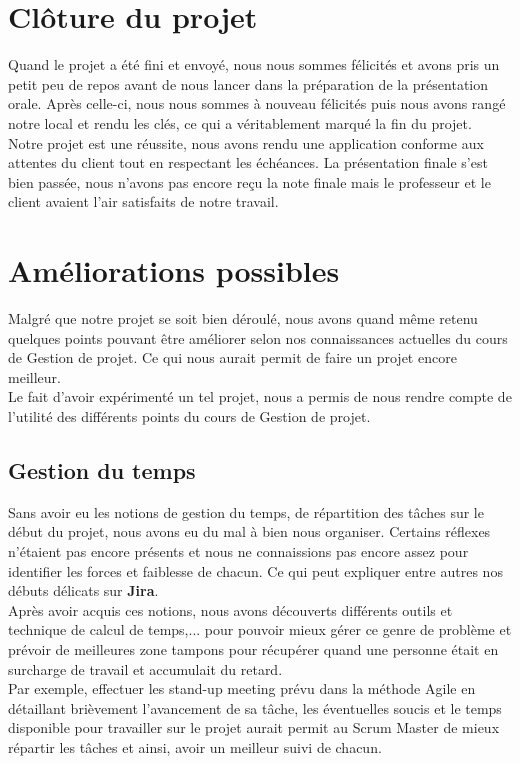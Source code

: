 \documentclass[t, 12pt, usenames,dvipsnames]{article}
\begin{document}
    \section{Clôture du projet}
        \noindent Quand le projet a été fini et envoyé, nous nous sommes félicités et avons pris un petit peu de repos avant de nous lancer dans la préparation de la présentation orale. Après celle-ci, nous nous sommes à nouveau félicités puis nous avons rangé notre local et rendu les clés, ce qui a véritablement marqué la fin du projet.\\
        Notre projet est une réussite, nous avons rendu une application conforme aux attentes du client tout en respectant les échéances. La présentation finale s'est bien passée, nous n'avons pas encore reçu la note finale mais le professeur et le client avaient l'air satisfaits de notre travail.\\
        
    \newpage
    
     \section{Améliorations possibles}
     \noindent Malgré que notre projet se soit bien déroulé, nous avons quand même retenu quelques points pouvant être améliorer selon nos connaissances actuelles du cours de Gestion de projet. Ce qui nous aurait permit de faire un projet encore meilleur. \\
     Le fait d'avoir expérimenté un tel projet, nous a permis de nous rendre compte de l'utilité des différents points du cours de Gestion de projet.
     
     
     \subsection{Gestion du temps}
     \noindent Sans avoir eu les notions de gestion du temps, de répartition des tâches sur le début du projet, nous avons eu du mal à bien nous organiser. Certains réflexes n'étaient pas encore présents et nous ne connaissions pas encore assez pour identifier les forces et faiblesse de chacun. Ce qui peut expliquer entre autres nos débuts délicats sur \textbf{Jira}. \\
     Après avoir acquis ces notions, nous avons découverts différents outils et technique de calcul de temps,... pour pouvoir mieux gérer ce genre de problème et prévoir de meilleures zone tampons pour récupérer quand une personne était en surcharge de travail et accumulait du retard.
     \\Par exemple, effectuer les stand-up meeting prévu dans la méthode Agile en détaillant brièvement l'avancement de sa tâche, les éventuelles soucis et le temps disponible pour travailler sur le projet aurait permit au Scrum Master de mieux répartir les tâches et ainsi, avoir un meilleur suivi de chacun.
     
\end{document}
